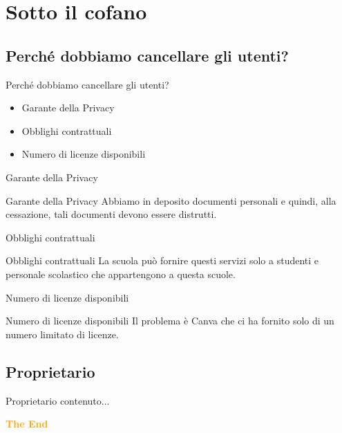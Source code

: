 \documentclass{beamer}
\begin{document}
\section{Sotto il cofano}
\subsection{Perché dobbiamo cancellare gli utenti?}
\begin{frame}{Perché dobbiamo cancellare gli utenti?}
	\begin{itemize}
		\item<1-> Garante della Privacy
		\item<2-> Obblighi contrattuali
		\item<3-> Numero di licenze disponibili
	\end{itemize}
\end{frame}
\begin{frame}{Garante della Privacy}
\begin{exampleblock}{Garante della Privacy}
Abbiamo in deposito documenti personali e quindi, alla cessazione, tali documenti devono essere distrutti.
\end{exampleblock}
\end{frame}
\begin{frame}{Obblighi contrattuali}
	\begin{block}{Obblighi contrattuali}
	La scuola può fornire questi servizi solo a studenti e personale scolastico che appartengono a questa scuole.
	\end{block}
\end{frame}
\begin{frame}{Numero di licenze disponibili}
	\begin{alertblock}{Numero di licenze disponibili}
		Il problema è Canva che ci ha fornito solo di un numero limitato di licenze.
	\end{alertblock}
\end{frame}
\subsection{Proprietario}
\begin{frame}{Proprietario}
	contenuto...
\end{frame}
\begin{frame}[standout]
\centering
\Huge\bfseries
\textcolor{orange}{The End}
\end{frame}
\end{document}
